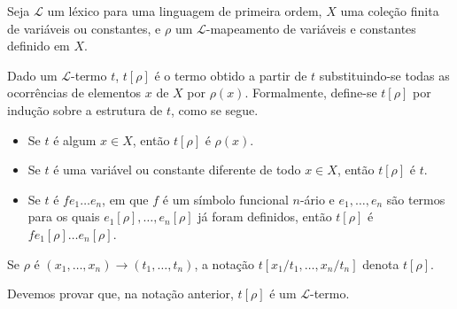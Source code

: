 \begin{metadefinition}\label{mdef:substituicaoEmTermos}
    Seja $\mathcal L$ um léxico para uma linguagem de primeira ordem, $X$ uma coleção finita de variáveis ou constantes, e $\rho$ um $\mathcal L$-mapeamento de variáveis e constantes definido em $X$.

    Dado um $\mathcal L$-termo $t$, $t[\rho]$ é o termo obtido a partir de $t$ substituindo-se todas as ocorrências de elementos $x$ de $X$ por $\rho(x)$.
    Formalmente, define-se $t[\rho]$ por indução sobre a estrutura de $t$, como se segue.
    \begin{itemize}
        \item Se $t$ é algum $x \in X$, então $t[\rho]$ é $\rho(x)$.
        \item Se $t$ é uma variável ou constante diferente de todo $x \in X$, então $t[\rho]$ é $t$.
        \item Se $t$ é $fe_1 \dots e_n$, em que $f$ é um símbolo funcional $n$-ário e $e_1, \dots, e_n$ são termos para os quais $e_1[\rho], \dots, e_n[\rho]$ já foram definidos, então $t[\rho]$ é $fe_1[\rho] \dots e_n[\rho]$.
    \end{itemize}

    Se $\rho$ é $(x_1, \dots, x_n)\to (t_1, \dots, t_n)$, a notação $t[x_1/t_1, \dots, x_n/t_n]$ denota $t[\rho]$.
\end{metadefinition}

Devemos provar que, na notação anterior, $t[\rho]$ é um $\mathcal L$-termo.

